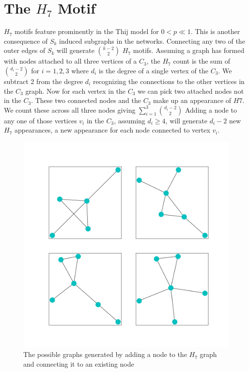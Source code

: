 \section{The \texorpdfstring{$H_{7}$}{H7} Motif}
$H_{7}$ motifs feature prominently in the Thij model for $0<p \ll 1$. This is another consequence
of $S_k$ induced subgraphs in the networks. Connecting any two of the outer edges of $S_k$
will generate ${k-2 \choose 2}$ $H_{7}$ motifs. Assuming a graph has
formed with nodes attached to all three vertices of a $C_3$, the $H_{7}$ count is
the sum of ${d_i-2 \choose 2}$ for $i=1,2,3$ where $d_i$ is the degree of a single vertex of the $C_3$. We subtract 
2 from the degree $d_i$ recognizing the connections to the other vertices in the $C_3$ graph. Now for each vertex in the $C_3$
we can pick two attached nodes not in the $C_3$. These two connected nodes and the $C_3$ make up an appearance of $H7$. We count
these across all three nodes giving $\sum^{3}_{i=1}{d_i-2 \choose 2}$
  Adding a node to any one of those vertices $v_i$ in the $C_3$, assuming 
$d_i\geq 4$, will generate $d_i-2$ new $H_{7}$ appearances, a new appearance for each node connected to vertex $v_i$.

\begin{figure}[!ht]
    \includegraphics[width=12cm]{Images/H7_evolution.png}
    \centering
    \caption{The possible graphs generated by adding a node to the $H_{7}$ graph 
    and connecting it to an existing node}
\end{figure}
\FloatBarrier

